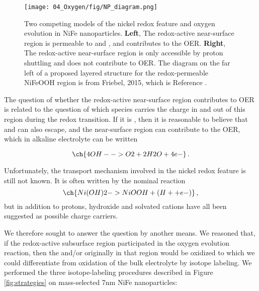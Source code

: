 \begin{figure}[h!]
	\centering
	\texttt{[image: 04\_Oxygen/fig/NP\_diagram.png]}
	\caption{Two competing models of the nickel redox feature and oxygen evolution in NiFe nanoparticles. \textbf{Left}, The redox-active near-surface region is permeable to  and , and contributes to the OER. \textbf{Right}, The redox-active near-surface region is only accessible by proton shuttling and does not contribute to OER. The diagram on the far left of a proposed layered structure for the redox-permeable NiFeOOH region is from Friebel, 2015, which is Reference \cite{Friebel2015}.}
	\label{fig:NP_diagram}
\end{figure}

The question of whether the redox-active near-surface region contributes to OER is related to the question of which species carries the charge in and out of this region during the redox transition. If it is , then it is reasonable to believe that  and  can also escape, and the near-surface region can contribute to the OER, which in alkaline electrolyte can be written

\begin{equation}
\ch{4 OH- -> O2 + 2 H2O + 4 e-}\,.\label{rxn:OER_alkaline}
\end{equation}

Unfortunately, the transport mechanism involved in the nickel redox feature is still not known\cite{Dionigi2016b}. It is often written by the nominal reaction 
\begin{equation}
\ch{Ni(OH)2 -> NiOOH + (H+ + e- )}\,,\label{rxn:Ni_redox}
\end{equation}
but in addition to protons, hydroxide and solvated cations have all been suggested as possible charge carriers\cite{WehrensDijksma2006}.

We therefore sought to answer the question by another means. We reasoned that, if the redox-active subsurface region participated in the oxygen evolution reaction, then the  and/or  originally in that region would be oxidized to  which we could differentiate from oxidation of the bulk electrolyte by isotope labeling. We performed the three isotope-labeling procedures described in Figure \ref{fig:strategies} on mass-selected 7nm NiFe nanoparticles:


